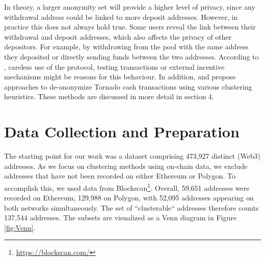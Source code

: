 \documentclass[12pt,a4paper,titlepage,oneside,english]{article}
\begin{document}
In theory, a larger anonymity set will provide a higher level of privacy, since  any withdrawal address could be linked to more deposit addresses. However, in practice this does not always hold true. %
Some users reveal the link between their withdrawal and deposit addresses, which also affects the privacy of other depositors. For example, by withdrawing from the pool with the same address they deposited or directly sending funds between the two addresses. According to \cite{nadler2023tornado}, careless use of the protocol, testing transactions or external incentive mechanisms might be reasons for this behaviour. \newline
In addition, \cite{Beres2020} and \cite{wu2022tutela} propose approaches to de-anonymize Tornado cash transactions using various clustering heuristics. These methods are discussed in more detail in section 4.

\iffalse
In theory, a larger anonymity set will provide a higher level of privacy as third parties will not be able to link a specific depositor address to a specific withdrawal address. However, this is not always the case. For example, some users (might) withdraw from the pool with the same address as they deposited. According to \cite{nadler2023tornado}, careless use of the protocol, testing transactions or external incentive mechanisms might be reasons for this behaviour. \newline
In addition, \cite{Beres2020} and \cite{wu2022tutela} propose approaches to de-anonymize Tornado cash transactions using various clustering heuristics. These methods are discussed in more detail in section 4.
\fi


\section{Data Collection and Preparation}
The starting point for our work was a dataset comprising 473,927 distinct (Web3) addresses. %
 As we focus on clustering methods using on-chain data, we exclude addresses that have not been recorded on either Ethereum or Polygon. To accomplish this, we used data from Blockscan\footnote{\url{https://blockscan.com/}}. Overall, 59,651 addresses were recorded on Ethereum, 129,988 on Polygon, with 52,095 addresses appearing on both networks simultaneously. The set of ``clusterable`` addresses therefore counts 137,544 addresses. The subsets are visualized as a Venn diagram in Figure \ref{fig:Venn}.
 
\end{document}
